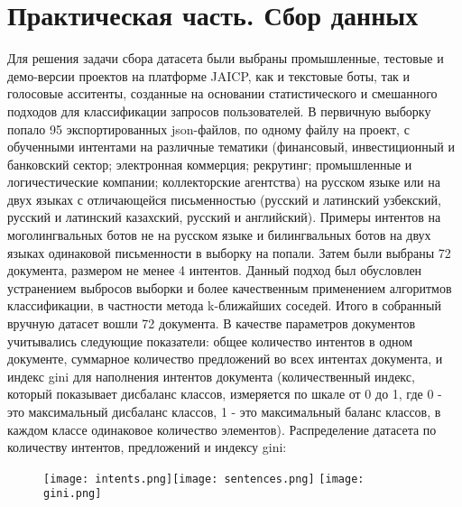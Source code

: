 \documentclass{article}
\begin{document}
\section{Практическая часть. Сбор данных}
Для решения задачи сбора датасета были выбраны промышленные, тестовые и демо-версии проектов на платформе JAICP, как и текстовые боты, так и голосовые асситенты, созданные на основании статистического и смешанного подходов для классификации запросов пользователей. В первичную выборку попало 95 экспортированных json-файлов, по одному файлу на проект, с обученными интентами на различные тематики (финансовый, инвестиционный и банковский сектор; электронная коммерция; рекрутинг; промышленные и логичестические компании; коллекторские агентства) на русском языке или на двух языках с отличающейся письменностью (русский и латинский узбекский, русский и латинский казахский, русский и английский). Примеры интентов на моголингвальных ботов не на русском языке и билингвальных ботов на двух языках одинаковой письменности в выборку на попали. 
Затем были выбраны 72 документа, размером не менее 4 интентов. Данный подход был обусловлен устранением выбросов выборки и более качественным применением алгоритмов классификации, в частности метода k-ближайших соседей. Итого в собранный вручную датасет вошли 72 документа.  В качестве параметров документов учитывались следующие показатели: общее количество интентов в одном документе, суммарное количество предложений во всех интентах документа, и индекс gini для наполнения интентов документа (количественный индекс, который показывает дисбаланс классов, измеряется по шкале от 0 до 1, где 0 - это максимальный дисбаланс классов, 1 - это максимальный баланс классов, в каждом классе одинаковое количество элементов). Распределение датасета по количеству интентов, предложений и индексу gini: 
\begin{figure}[h]
    \centering
    \texttt{[image: intents.png]}\texttt{[image: sentences.png]}
    \texttt{[image: gini.png]}
\end{figure}
\end{document}
